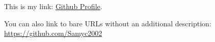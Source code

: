 \documentclass{article} %
\begin{document}
This is my link: \href{https://github.com/Samyc2002}{Github Profile}.

You can also link to bare URLs without an additional description: \url{https://github.com/Samyc2002}
\end{document}
